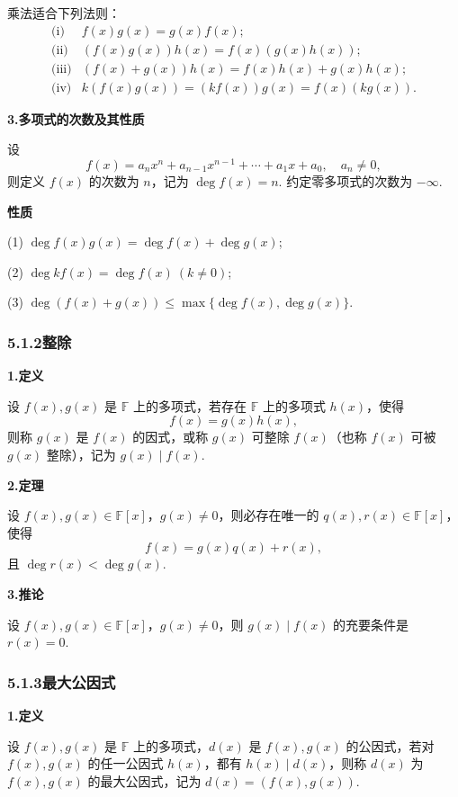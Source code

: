 \documentclass[UTF8, 12pt, fontset=fandol, oneside]{ctexart}
\begin{document}
乘法适合下列法则：
\[
\begin{array}{ll}
\text{(i)} & f(x)g(x)=g(x)f(x);\\
\text{(ii)} & (f(x)g(x))h(x)=f(x)(g(x)h(x));\\
\text{(iii)} & (f(x)+g(x))h(x)=f(x)h(x)+g(x)h(x);\\
\text{(iv)} & k(f(x)g(x))=(kf(x))g(x)=f(x)(kg(x)).
\end{array}
\]

\noindent\textbf{3.\quad 多项式的次数及其性质}

设
\[
f(x)=a_nx^n+a_{n-1}x^{n-1}+\cdots+a_1x+a_0,\quad a_n\ne0,
\]
则定义 $f(x)$ 的次数为 $n$，记为 $\deg f(x)=n$. 约定零多项式的次数为 $-\infty$.

\noindent\textbf{性质}

(1) $\deg f(x)g(x)=\deg f(x)+\deg g(x)$;

(2) $\deg kf(x)=\deg f(x)\ (k\ne0)$;

(3) $\deg(f(x)+g(x))\le\max\{\deg f(x),\deg g(x)\}$.

\subsubsection*{5.1.2\quad 整除}

\noindent\textbf{1.\quad 定义}

设 $f(x),g(x)$ 是 $\mathbb{F}$ 上的多项式，若存在 $\mathbb{F}$ 上的多项式 $h(x)$，使得
\[
f(x)=g(x)h(x),
\]
则称 $g(x)$ 是 $f(x)$ 的因式，或称 $g(x)$ 可整除 $f(x)$（也称 $f(x)$ 可被 $g(x)$ 整除），记为 $g(x)\mid f(x)$.

\noindent\textbf{2.\quad 定理}

设 $f(x),g(x)\in\mathbb{F}[x]$，$g(x)\ne0$，则必存在唯一的 $q(x),r(x)\in\mathbb{F}[x]$，使得
\[
f(x)=g(x)q(x)+r(x),
\]
且 $\deg r(x)<\deg g(x)$.

\noindent\textbf{3.\quad 推论}

设 $f(x),g(x)\in\mathbb{F}[x]$，$g(x)\ne0$，则 $g(x)\mid f(x)$ 的充要条件是 $r(x)=0$.

\subsubsection*{5.1.3\quad 最大公因式}

\noindent\textbf{1.\quad 定义}

设 $f(x),g(x)$ 是 $\mathbb{F}$ 上的多项式，$d(x)$ 是 $f(x),g(x)$ 的公因式，若对 $f(x),g(x)$ 的任一公因式 $h(x)$，都有 $h(x)\mid d(x)$，则称 $d(x)$ 为 $f(x),g(x)$ 的最大公因式，记为 $d(x)=(f(x),g(x))$.
\end{document}
